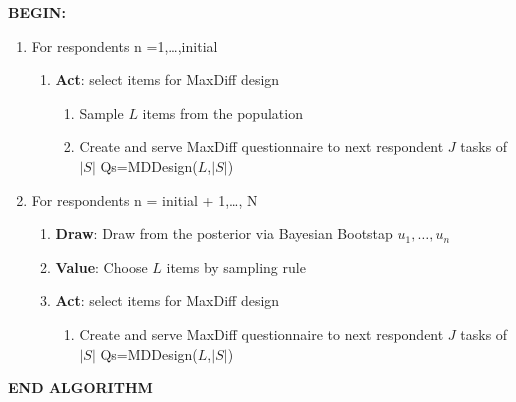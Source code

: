 \documentclass[nonblindrev]{informs3}
\begin{document}
\textbf{BEGIN:}
\begin{enumerate}
\item For respondents n =1,\ldots,initial
\begin{enumerate}
\item \textbf{Act}: select items for MaxDiff design
\begin{enumerate}
\item Sample $L$ items from the population 
\item Create and serve MaxDiff questionnaire to next respondent $J$ tasks of $|S|$ Qs=MDDesign($L$,$|S|$)
\end{enumerate}
\end{enumerate}
\item For respondents n = initial + 1,\ldots, N
\begin{enumerate}
\item \textbf{Draw}: Draw from the posterior via Bayesian Bootstap $u_1,\ldots,u_n$

\item \textbf{Value}: Choose $L$ items by sampling rule
\item \textbf{Act}: select items for MaxDiff design
\begin{enumerate}
\item Create and serve MaxDiff questionnaire to next respondent $J$ tasks of $|S|$ Qs=MDDesign($L$,$|S|$)
\end{enumerate}
\end{enumerate}
\end{enumerate}
\textbf{END ALGORITHM}
\end{document}
